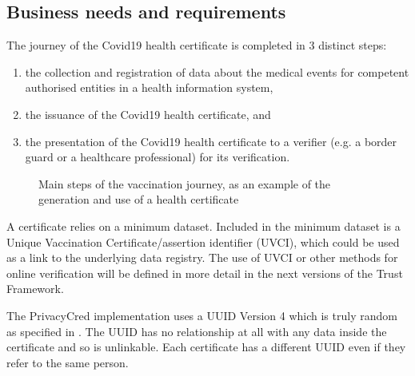 \documentclass[a4paper,12pt,english]{sphinxhowto}
\begin{document}
\subsection{Business needs and requirements}
\label{\detokenize{ssi/annotehealth:business-needs-and-requirements}}
\sphinxAtStartPar
The journey of the Covid\sphinxhyphen{}19 health certificate is completed in 3 distinct steps:
\begin{enumerate}
%
\item {} 
\sphinxAtStartPar
the collection and registration of data about the medical events for competent authorised entities in a health information system,

\item {} 
\sphinxAtStartPar
the issuance of the Covid\sphinxhyphen{}19 health certificate, and

\item {} 
\sphinxAtStartPar
the presentation of the Covid\sphinxhyphen{}19 health certificate to a verifier (e.g. a border guard or a healthcare professional) for its verification.

\end{enumerate}

\begin{figure}[htbp]
\centering
\capstart

\noindent{}
\caption{Main steps of the vaccination journey, as an example of the generation and use of a health certificate}\label{\detokenize{ssi/annotehealth:id8}}\end{figure}

\sphinxAtStartPar
A certificate relies on a minimum dataset. Included in the minimum dataset is a Unique Vaccination Certificate/assertion identifier (UVCI), which could be used as a link to the underlying data registry. The use of UVCI or other methods for online verification will be defined in more detail in the next versions of the Trust Framework.

\begin{sphinxShadowBox}

\sphinxAtStartPar
The PrivacyCred implementation uses a UUID Version 4 which is truly random as specified in . The UUID has no relationship at all with any data inside the certificate and so is unlinkable.
Each certificate has a different UUID even if they refer to the same person.
\end{sphinxShadowBox}
\end{document}
